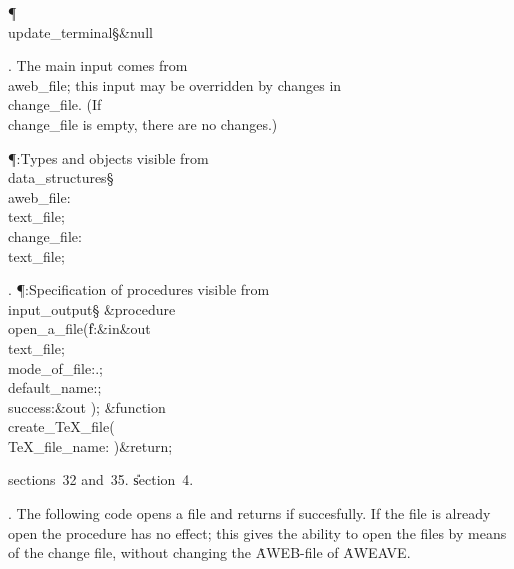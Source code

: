 \Y\P\4\D\\{update\_terminal}\?\S\?\&{null}\?\6
\?\par
\fi

. The main input comes from \\{aweb\_file}; this input may be overridden
by changes in \\{change\_file}.
(If \\{change\_file} is empty, there are no changes.)

\Y\P\?\4:Types and objects visible from \\{data\_structures}\X\mathrel{+}\S%
\?\6
\\{aweb\_file}\?:\?\\{text\_file};\6
\\{change\_file}\?:\?\\{text\_file};\par
\fi

. \P\?:Specification of procedures visible from \\{input\_output}\X\S\?%
\6
\&{procedure}\8\1\\{open\_a\_file}\?(\?\|f\?:\&{in}\?\8\&{out}\8\\{text\_file};%
\?\,\?\\{mode\_of\_file}\?:\?\?.\?;\?\,\?%
\\{default\_name}\?:\?;\?\,\1\?\\{success}\?:\?\&{out}\8%
\?\2)\?\2;\6
\&{function}\8\1\\{create\_TeX\_file}\?(\1\?\\{TeX\_file\_name}\?:\?%
\?\2)\&{return}\?\8\2;\par
\A sections~32 and~35.
\U section~4\*.\fi

. The following code opens a file and returns  if succesfully.
If the file is already open the procedure has no effect; this gives
the ability to open the files by means of the change file, without
changing the \.{AWEB}-file of \.{AWEAVE}.



